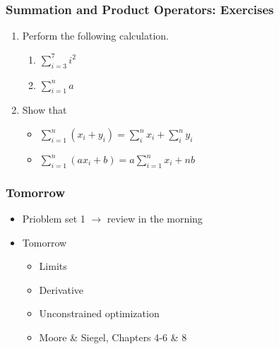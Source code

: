 \documentclass[pdflatex, 12pt]{beamer}
\begin{document}
\begin{frame}
\frametitle{Summation and Product Operators: Exercises}
\begin{enumerate}
\item Perform the following calculation.
 \begin{enumerate}
 \item $\sum_{i = 3}^{7} i^2$
 \item $\sum_{i = 1}^{n} a$
 \end{enumerate}
\vspace{0.4cm}
\item Show that
 \begin{itemize}
 \item $\sum_{i = 1}^{n} (x_i + y_i) = \sum_i^n x_i + \sum_i^n y_i$
 \item $\sum_{i = 1}^{n} (ax_i + b) = a\sum_{i = 1}^{n} x_i + nb$
 \end{itemize}
\end{enumerate}
\end{frame}

\begin{frame}
\frametitle{Tomorrow}
\begin{itemize}
\item Prioblem set 1 $\rightarrow$ review in the morning
\vspace{0.4cm}
\item Tomorrow
 \begin{itemize}
 \item Limits
 \item Derivative
 \item Unconstrained optimization
 \item Moore \& Siegel, Chapters 4-6 \& 8
 \end{itemize}
\end{itemize}
\end{frame}
\end{document}
